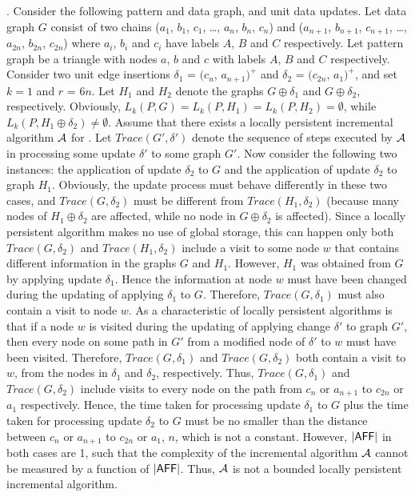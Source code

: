 .
Consider the following pattern and data graph, and unit data updates.
Let data graph $G$ consist of two chains ($a_1$, $b_1$, $c_1$, \ldots, $a_n$, $b_n$, $c_n$) and ($a_{n+1}$, $b_{n+1}$, $c_{n+1}$, \ldots, $a_{2n}$, $b_{2n}$, $c_{2n}$) where $a_i$, $b_i$ and $c_i$ have labels $A$, $B$ and $C$ respectively.
Let pattern graph be a triangle with nodes $a$, $b$ and $c$ with labels $A$, $B$ and $C$ respectively.
Consider two unit edge insertions $\delta_1$ = $(c_n$, $a_{n+1})^+$ and $\delta_2$ = $(c_{2n}$, $a_1)^+$,
and set $k = 1$ and $r$ = $6n$.
Let $H_1$ and $H_2$ denote the graphs $G\oplus \delta_1$ and $G\oplus \delta_2$, respectively.
Obviously, $L_{k}(P, G) = L_{k}(P, H_1) = L_{k}(P, H_2) = \emptyset$,
while $L_{k}(P, H_1\oplus \delta_2) \neq \emptyset$.
Assume that there exists a locally persistent incremental algorithm ${\cal A}$ for \dynteamF.
Let $Trace(G', \delta')$ denote the sequence of steps executed by ${\cal A}$ in processing some update $\delta'$ to some graph $G'$.
Now consider the following two instances: the application of update $\delta_2$ to $G$ and the application of update $\delta_2$ to graph $H_1$.
Obviously, the update process must behave differently in these two cases, and $Trace(G, \delta_2)$ must be different from $Trace(H_1, \delta_2)$
(because many nodes of $H_1\oplus \delta_2$ are affected, while no node in $G\oplus \delta_2$ is affected).
Since a locally persistent algorithm makes no use of global storage, this can happen only both $Trace(G, \delta_2)$ and $Trace(H_1, \delta_2)$ include a visit to some node $w$ that contains different information in the graphs $G$ and $H_1$.
However, $H_1$ was obtained from $G$ by applying update $\delta_1$.
Hence the information at node $w$ must have been changed during the updating of applying $\delta_1$ to $G$.
Therefore, $Trace(G, \delta_1)$ must also contain a visit to node $w$.
As a characteristic of locally persistent algorithms is that if a node $w$ is visited during the updating of applying change $\delta'$ to graph $G'$,
then every node on some path in $G'$ from a modified node of $\delta'$ to $w$ must have been visited.
Therefore, $Trace(G, \delta_1)$ and $Trace(G, \delta_2)$ both contain a visit to $w$,
from the nodes in $\delta_1$ and $\delta_2$, respectively.
Thus, $Trace(G, \delta_1)$ and $Trace(G, \delta_2)$ include visits to every node on the path from $c_n$ or $a_{n+1}$ to $c_{2n}$ or $a_1$ respectively.
Hence, the time taken for processing update $\delta_1$ to $G$ plus the time taken for processing update $\delta_2$ to $G$ must be no smaller than the distance between $c_n$ or $a_{n+1}$ to $c_{2n}$ or $a_1$, \ie $n$, which is not a constant.
However, $|{\mathsf{AFF}}|$ in both cases are 1, such that the complexity of the incremental algorithm ${\cal A}$ cannot be measured by a function of $|{\mathsf{AFF}}|$.
Thus, ${\cal A}$ is not a bounded locally persistent incremental algorithm.

